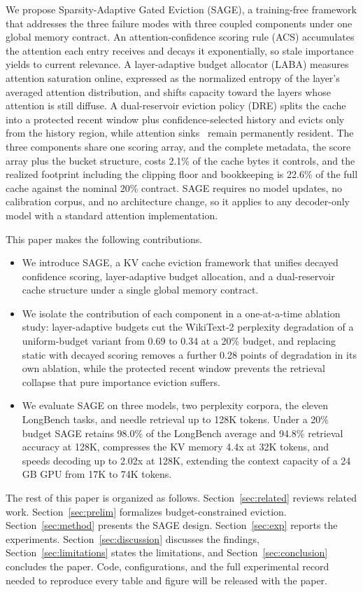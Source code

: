 We propose Sparsity-Adaptive Gated Eviction (SAGE), a training-free
framework that addresses the three failure modes with three coupled
components under one global memory contract. An attention-confidence
scoring rule (ACS) accumulates the attention each entry receives and
decays it exponentially, so stale importance yields to current
relevance. A layer-adaptive budget allocator (LABA) measures attention
saturation online, expressed as the normalized entropy of the layer's
averaged attention distribution, and shifts capacity toward the layers
whose attention is still diffuse. A dual-reservoir eviction policy
(DRE) splits the cache into a protected recent window plus
confidence-selected history and evicts only from the history region,
while attention sinks~\cite{xiao2023efficient} remain permanently
resident. The three components share one scoring array, and the
complete metadata, the score array plus the bucket structure, costs
2.1\% of the cache bytes it controls, and the realized footprint
including the clipping floor and bookkeeping is 22.6\% of the full
cache against the nominal 20\% contract.
SAGE requires no model updates, no calibration corpus, and no
architecture change, so it applies to any decoder-only model with a
standard attention implementation.

This paper makes the following contributions.
\begin{itemize}[leftmargin=1.6em, itemsep=2pt, topsep=3pt]
\item We introduce SAGE, a KV cache eviction framework that unifies
      decayed confidence scoring, layer-adaptive budget allocation, and
      a dual-reservoir cache structure under a single global memory
      contract.
\item We isolate the contribution of each component in a
      one-at-a-time ablation study: layer-adaptive budgets cut the
      WikiText-2 perplexity degradation of a uniform-budget variant
      from 0.69 to 0.34 at a 20\% budget, and replacing static with
      decayed scoring removes a further 0.28 points of degradation in
      its own ablation, while the protected recent window prevents the
      retrieval collapse that pure importance eviction suffers.
\item We evaluate SAGE on three models, two perplexity corpora, the
      eleven LongBench tasks, and needle retrieval up to 128K tokens.
      Under a 20\% budget SAGE retains 98.0\% of the LongBench average
      and 94.8\% retrieval accuracy at 128K, compresses the KV memory
      4.4x at 32K tokens, and speeds decoding up to 2.02x at 128K,
      extending the context capacity of a 24 GB GPU from 17K to 74K
      tokens.
\end{itemize}

The rest of this paper is organized as follows.
Section~\ref{sec:related} reviews related work.
Section~\ref{sec:prelim} formalizes budget-constrained eviction.
Section~\ref{sec:method} presents the SAGE design.
Section~\ref{sec:exp} reports the experiments.
Section~\ref{sec:discussion} discusses the findings,
Section~\ref{sec:limitations} states the limitations, and
Section~\ref{sec:conclusion} concludes the paper. Code, configurations,
and the full experimental record needed to reproduce every table and
figure will be released with the paper.

